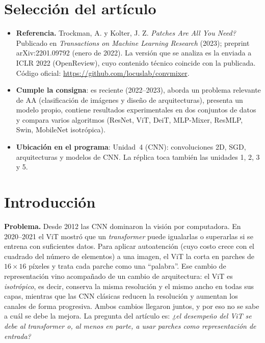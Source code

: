 \documentclass[11pt,a4paper]{article}
\begin{document}
\section{Selección del artículo}
\begin{itemize}
  \item \textbf{Referencia.} Trockman, A. y Kolter, J. Z. \emph{Patches Are All You Need?} Publicado en
  \emph{Transactions on Machine Learning Research} (2023); preprint arXiv:2201.09792 (enero de 2022). La versión
  que se analiza es la enviada a ICLR 2022 (OpenReview), cuyo contenido técnico coincide con la publicada. Código
  oficial: \url{https://github.com/locuslab/convmixer}.
  \item \textbf{Cumple la consigna}: es reciente (2022--2023), aborda un problema relevante de AA (clasificación
  de imágenes y diseño de arquitecturas), presenta un modelo propio, contiene resultados experimentales en dos
  conjuntos de datos y compara varios algoritmos (ResNet, ViT, DeiT, MLP-Mixer, ResMLP, Swin, MobileNet isotrópica).
  \item \textbf{Ubicación en el programa}: Unidad~4 (CNN): convoluciones 2D, SGD, arquitecturas y modelos de CNN.
  La réplica toca también las unidades 1, 2, 3 y 5.
\end{itemize}

\section{Introducción}
\textbf{Problema.} Desde 2012 las CNN dominaron la visión por computadora. En 2020--2021 el ViT
\citep{vit} mostró que un \emph{transformer} puede igualarlas o superarlas si se entrena con suficientes datos.
Para aplicar autoatención (cuyo costo crece con el cuadrado del número de elementos) a una imagen, el ViT la corta
en parches de $16\times16$ píxeles y trata cada parche como una ``palabra''. Ese cambio de representación vino
acompañado de un cambio de arquitectura: el ViT es \emph{isotrópico}, es decir, conserva la misma resolución y el
mismo ancho en todas sus capas, mientras que las CNN clásicas reducen la resolución y aumentan los canales de forma
progresiva. Ambos cambios llegaron juntos, y por eso no se sabe a cuál se debe la mejora. La pregunta del artículo
es: \emph{¿el desempeño del ViT se debe al transformer o, al menos en parte, a usar parches como representación de
entrada?}
\end{document}
